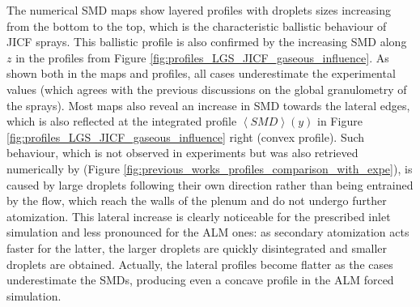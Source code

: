 The numerical SMD maps show layered profiles with droplets sizes increasing from the bottom to the top, which is the characteristic ballistic behaviour of JICF sprays. This ballistic profile is also confirmed by the increasing SMD along $z$ in the profiles from Figure \ref{fig:profiles_LGS_JICF_gaseous_influence}. As shown both in the maps and profiles, all cases underestimate the experimental values (which agrees with the previous discussions on the global granulometry of the sprays). Most maps also reveal an increase in SMD towards the lateral edges, which is also reflected at the integrated profile $\left\langle SMD \right\rangle \left( y \right)$ in Figure \ref{fig:profiles_LGS_JICF_gaseous_influence} right (convex profile). Such behaviour, which is not observed in experiments but was also retrieved numerically by  (Figure \ref{fig:previous_works_profiles_comparison_with_expe}), is caused by large droplets following their own direction rather than being entrained by the flow, which reach the walls of the plenum and do not undergo further atomization. This lateral increase is clearly noticeable for the prescribed inlet simulation and less pronounced for the ALM ones: as secondary atomization acts faster for the latter, the larger droplets are quickly disintegrated and smaller droplets are obtained. Actually, the lateral profiles become flatter as the cases underestimate the SMDs, producing even a concave profile in the ALM forced simulation.





\clearpage


